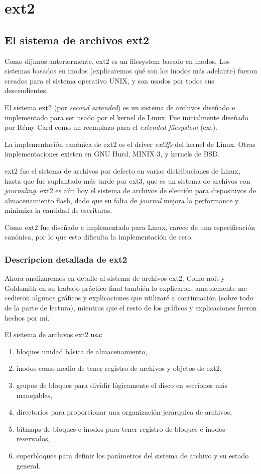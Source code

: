 \chapter{ext2}

\section{El sistema de archivos ext2}

Como dijimos anteriormente, ext2 es un filesystem basado en inodos. Los sistemas basados en inodos (explicaremos qué son los inodos más adelante) fueron creados para el sistema operativo UNIX, y son usados por todos sus descendientes.

El sistema ext2 (por \emph{second extended}) es un sistema de archivos diseñado e implementado para ser usado por el kernel de Linux. Fue inicialmente diseñado por Rémy Card como un reemplazo para el \emph{extended filesystem} (ext).

La implementación canónica de ext2 es el driver \emph{ext2fs} del kernel de Linux. Otras implementaciones existen en GNU Hurd, MINIX 3, y kernels de BSD.

ext2 fue el sistema de archivos por defecto en varias distribuciones de Linux, hasta que fue suplantado más tarde por ext3, que es un sistema de archivos con \emph{journaling}.
ext2 es aún hoy el sistema de archivos de elección para dispositivos de almacenamiento flash, dado que su falta de \emph{journal} mejora la performance y minimiza la cantidad de escrituras. 


Como ext2 fue diseñado e implementado para Linux, carece de una especificación canónica, por lo que esto dificulta la implementación de cero.

\subsection{Descripcion detallada de ext2}

Ahora analizaremos en detalle al sistema de archivos ext2. Como noit y Goldsmith en su trabajo práctico final también lo explicaron, amablemente me cedieron algunos gráficos y explicaciones que utilizaré a continuación (sobre todo de la parte de lectura), mientras que el resto de los gráficos y explicaciones fueron hechos por mí.

El sistema de archivos ext2 usa:
\begin{enumerate}
  \item bloques unidad básica de almacenamiento,
  \item inodos como medio de tener registro de archivos y objetos de ext2,
  \item  grupos de bloques para dividir lógicamente el disco en secciones más manejables,
  \item directorios para proporcionar una organización jerárquica de archivos,
  \item bitmaps de bloques e inodos para tener registro de bloques e inodos reservados,
  \item superbloques para definir los parámetros del sistema de archivo y su estado general.
\end{enumerate}

